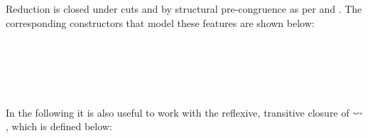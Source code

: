 \begin{AgdaAlign}
Reduction is closed under cuts and by structural pre-congruence as per \RCut and
\RCong. The corresponding constructors that model these features are shown
below:

\begin{code}%
%
\>[2]%
\>[14]\AgdaSymbol{:}%
\>[738I]\AgdaSpace{}%
\AgdaSpace{}%
\AgdaSpace{}%
\AgdaSymbol{\}}\AgdaSpace{}%
\AgdaSymbol{\{}\AgdaSpace{}%
\AgdaSpace{}%
\AgdaSymbol{:}\AgdaSpace{}%
\AgdaSpace{}%
\AgdaSymbol{(}\AgdaSpace{}%
\AgdaSpace{}%
\AgdaSymbol{)\}}\AgdaSpace{}%
\AgdaSymbol{\{}\AgdaSpace{}%
\AgdaSymbol{:}\AgdaSpace{}%
\AgdaSpace{}%
\AgdaSymbol{(}\AgdaSpace{}%
\AgdaSpace{}%
\AgdaSymbol{)\}}\<%
\\
\>[.][@{}l@{}]\<[738I]%
\>[16]\AgdaSymbol{(}\AgdaSpace{}%
\AgdaSymbol{:}\AgdaSpace{}%
\AgdaSpace{}%
\AgdaSpace{}%
\AgdaSymbol{)}\AgdaSpace{}%
\AgdaSymbol{(}\AgdaSpace{}%
\AgdaSymbol{:}\AgdaSpace{}%
\AgdaSpace{}%
\AgdaSpace{}%
\AgdaSpace{}%
\AgdaOperator{\AgdaDatatype{+}}\AgdaSpace{}%
\AgdaSymbol{)}\AgdaSpace{}%
\AgdaSpace{}%
\AgdaSpace{}%
\AgdaSpace{}%
\AgdaSpace{}%
\<%
\\
%
\>[16]\AgdaSpace{}%
\AgdaSpace{}%
\AgdaSpace{}%
\AgdaSpace{}%
\AgdaSpace{}%
\AgdaSpace{}%
\AgdaSpace{}%
\AgdaSpace{}%
\AgdaSpace{}%
\AgdaSpace{}%
\<%
\\
%
\\[\AgdaEmptyExtraSkip]%
%
\>[2]%
\>[14]\AgdaSymbol{:}\AgdaSpace{}%
\AgdaSpace{}%
\AgdaSpace{}%
\AgdaSpace{}%
\AgdaSymbol{:}\AgdaSpace{}%
\AgdaSpace{}%
\AgdaSymbol{\}}\AgdaSpace{}%
\AgdaSpace{}%
\AgdaSpace{}%
\AgdaSpace{}%
\AgdaSpace{}%
\AgdaSpace{}%
\AgdaSpace{}%
\AgdaSpace{}%
\AgdaSpace{}%
\AgdaSpace{}%
\AgdaSpace{}%
\AgdaSpace{}%
\<%
\end{code}
\end{AgdaAlign}
In the following it is also useful to work with the reflexive, transitive
closure of $\leadsto$, which is defined below:

